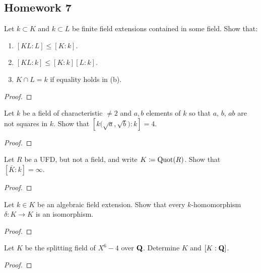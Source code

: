 \subsection{Homework 7}
\begin{problem}
  Let $k\subset K$ and $k\subset L$ be finite field extensions contained in
  some field. Show that:
  \begin{enumerate}[label=(\alph*)]
  \item $[KL:L]\leq [K:k]$.
  \item $[KL:k]\leq [K:k][L:k]$.
  \item $K\cap L=k$ if equality holds in (b).
  \end{enumerate}
\end{problem}
\begin{proof}
\end{proof}

\begin{problem}
  Let $k$ be a field of characteristic $\neq 2$ and $a,b$ elements of $k$
  so that $a$, $b$, $ab$ are not squares in $k$. Show that
  $\left[k{\bigl(\sqrt{a},\sqrt{b}\bigr)}:k\right]=4$.
\end{problem}
\begin{proof}
\end{proof}

\begin{problem}
  Let $R$ be a UFD, but not a field, and write $K\coloneqq\operatorname{Quot}(R)$. Show
  that $[\bar K:k]=\infty$.
\end{problem}
\begin{proof}
\end{proof}

\begin{problem}
  Let $k\in K$ be an algebraic field extension. Show that every
  $k$-homomorphism $\delta\colon K\to K$ is an isomorphism.
\end{problem}
\begin{proof}
\end{proof}

\begin{problem}
  Let $K$ be the splitting field of $X^6-4$ over $\mathbf{Q}$. Determine $K$ and
  $[K:\mathbf{Q}]$.
\end{problem}
\begin{proof}
\end{proof}

